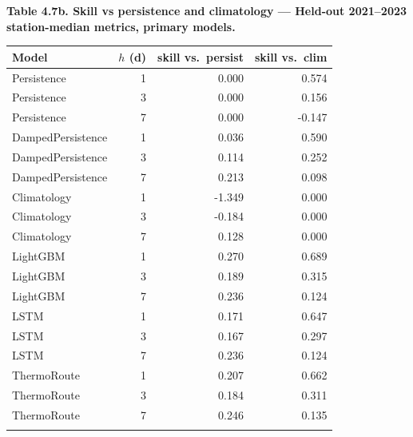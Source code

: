 \begin{table}[htbp]
\centering
\footnotesize
\setlength{\tabcolsep}{4pt}
\renewcommand{\arraystretch}{1.1}
\textbf{Table 4.7b. Skill vs persistence and climatology --- Held-out 2021--2023 station-median metrics, primary models.}
\par\medskip
\begin{tabular}{@{}lrrr@{}}
\toprule\noalign{}
Model & $h$ (d) & skill vs.\ persist & skill vs.\ clim \\
\midrule\noalign{}
Persistence & 1 & 0.000 & 0.574 \\
Persistence & 3 & 0.000 & 0.156 \\
Persistence & 7 & 0.000 & -0.147 \\
DampedPersistence & 1 & 0.036 & 0.590 \\
DampedPersistence & 3 & 0.114 & 0.252 \\
DampedPersistence & 7 & 0.213 & 0.098 \\
Climatology & 1 & -1.349 & 0.000 \\
Climatology & 3 & -0.184 & 0.000 \\
Climatology & 7 & 0.128 & 0.000 \\
LightGBM & 1 & 0.270 & 0.689 \\
LightGBM & 3 & 0.189 & 0.315 \\
LightGBM & 7 & 0.236 & 0.124 \\
LSTM & 1 & 0.171 & 0.647 \\
LSTM & 3 & 0.167 & 0.297 \\
LSTM & 7 & 0.236 & 0.124 \\
ThermoRoute & 1 & 0.207 & 0.662 \\
ThermoRoute & 3 & 0.184 & 0.311 \\
ThermoRoute & 7 & 0.246 & 0.135 \\
\bottomrule\noalign{}
\end{tabular}
\end{table}

